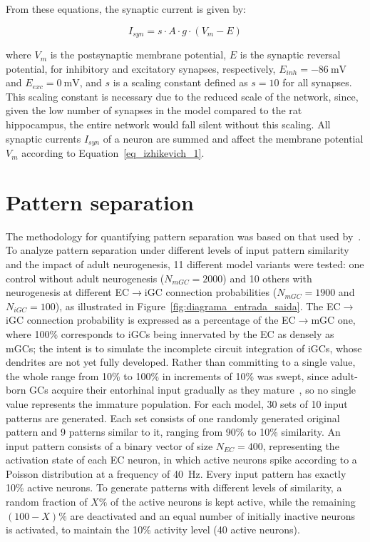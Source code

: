 From these equations, the synaptic current is given by:

\begin{equation}
    \label{eq_tsodyks_I}
    I_{syn} = s \cdot A \cdot g \cdot (V_m - E)
\end{equation}

where $V_m$ is the postsynaptic membrane potential, $E$ is the synaptic reversal potential, for inhibitory and excitatory
synapses, respectively, $E_{inh} = \SI{-86}{\milli\volt}$ and $E_{exc} = \SI{0}{\milli\volt}$, and $s$ is a scaling constant
defined as $s = 10$ for all synapses. This scaling constant is necessary due to the reduced scale of the network, since, given
the low number of synapses in the model compared to the rat hippocampus, the entire network would fall silent without this
scaling. All synaptic currents $I_{syn}$ of a neuron are summed and affect the membrane potential $V_m$ according to
Equation~\ref{eq_izhikevich_1}.



\section{Pattern separation}\label{sec:separacao_padroes}

The methodology for quantifying pattern separation was based on that used by~\textcite{kimEffect2024}. To analyze pattern
separation under different levels of input pattern similarity and the impact of adult neurogenesis, 11 different model variants
were tested: one control without adult neurogenesis ($N_{mGC} = 2000$) and 10 others with neurogenesis at different EC$\to$iGC
connection probabilities ($N_{mGC} = 1900$ and $N_{iGC} = 100$), as illustrated in Figure~\ref{fig:diagrama_entrada_saida}. The
EC$\to$iGC connection probability is expressed as a percentage of the EC$\to$mGC one, where 100\% corresponds to iGCs being
innervated by the EC as densely as mGCs; the intent is to simulate the incomplete circuit integration of iGCs, whose dendrites are
not yet fully developed. Rather than committing to a single value, the whole range from 10\% to 100\% in increments of 10\% was
swept, since adult-born GCs acquire their entorhinal input gradually as they mature~\parencite{espositoNeuronal2005,
aimoneRegulation2014}, so no single value represents the immature population. For each model, 30 sets of 10 input patterns are
generated. Each set consists of one randomly generated original pattern and 9 patterns similar to it, ranging from 90\% to 10\%
similarity. An input pattern consists of a binary vector of size $N_{EC} = 400$, representing the activation state of each EC
neuron, in which active neurons spike according to a Poisson distribution at a frequency of \SI{40}{\hertz}. Every input pattern
has exactly 10\% active neurons. To generate patterns with different levels of similarity, a random fraction of $X\%$ of the
active neurons is kept active, while the remaining $(100 - X)\%$ are deactivated and an equal number of initially inactive neurons
is activated, to maintain the 10\% activity level (40 active neurons).

